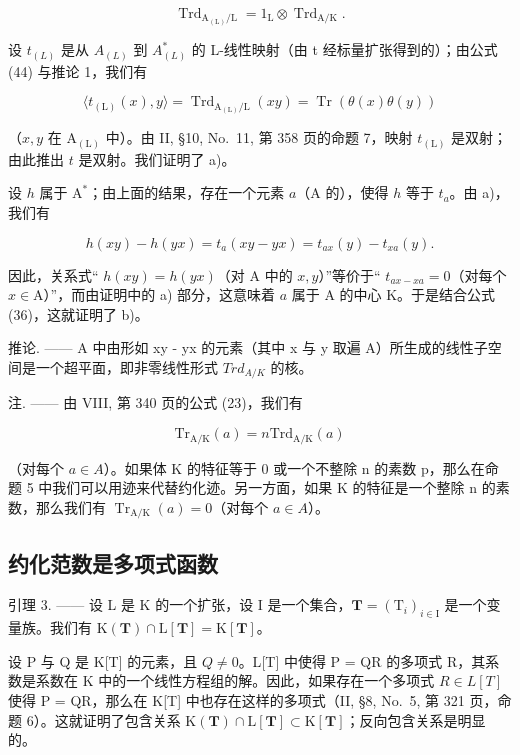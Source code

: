 \[
\operatorname{Trd} _ {\mathrm{A} _ {(\mathrm{L})} / \mathrm{L}} = 1 _ {\mathrm{L}} \otimes \operatorname{Trd} _ {\mathrm{A} / \mathrm{K}}.\tag{44}
\]

设 \(t_{(L)}\) 是从 \(A_{(L)}\) 到 \(A_{(L)}^{*}\) 的 L-线性映射（由 t 经标量扩张得到的）；由公式 (44) 与推论 1，我们有

\[
\langle t _ {(\mathrm{L})} (x), y \rangle = \operatorname{Trd} _ {\mathrm{A} _ {(\mathrm{L})} / \mathrm{L}} (x y) = \operatorname{Tr} (\theta (x) \theta (y))\tag{45}
\]

（\(x, y\) 在 \(\mathrm{A}_{(\mathrm{L})}\) 中）。由 II, §10, No.~11, 第 358 页的命题 7，映射 \(t_{(\mathrm{L})}\) 是双射；由此推出 \(t\) 是双射。我们证明了 a)。

设 \(h\) 属于 \(\mathrm{A}^*\)；由上面的结果，存在一个元素 \(a\)（\(\mathrm{A}\) 的），使得 \(h\) 等于 \(t_a\)。由 a)，我们有

\[
h (x y) - h (y x) = t _ {a} (x y - y x) = t _ {a x} (y) - t _ {x a} (y).
\]

因此，关系式`` \(h(xy) = h(yx)\)（对 A 中的 \(x,y\)）''等价于`` \(t_{ax-xa} = 0\)（对每个 \(x \in \mathrm{A}\)）''，而由证明中的 a) 部分，这意味着 \(a\) 属于 A 的中心 K。于是结合公式 (36)，这就证明了 b)。

推论. —— A 中由形如 xy - yx 的元素（其中 x 与 y 取遍 A）所生成的线性子空间是一个超平面，即非零线性形式 \(Trd_{A/K}\) 的核。

注. —— 由 VIII, 第 340 页的公式 (23)，我们有

\[
\mathrm{Tr} _ {\mathrm{A/K}} (a) = n \mathrm{Trd} _ {\mathrm{A/K}} (a)
\]

（对每个 \(a \in A\)）。如果体 K 的特征等于 0 或一个不整除 n 的素数 p，那么在命题 5 中我们可以用迹来代替约化迹。另一方面，如果 K 的特征是一个整除 n 的素数，那么我们有 \(\operatorname{Tr}_{\mathrm{A}/\mathrm{K}}(a) = 0\)（对每个 \(a \in A\)）。

\subsection{约化范数是多项式函数}

引理 3. —— 设 L 是 K 的一个扩张，设 I 是一个集合，\(\mathbf{T} = (\mathrm{T}_i)_{i\in \mathrm{I}}\) 是一个变量族。我们有 \(\mathrm{K}(\mathbf{T})\cap \mathrm{L}[\mathbf{T}] = \mathrm{K}[\mathbf{T}]\)。

设 P 与 Q 是 K{[}T{]} 的元素，且 \(Q \neq 0\)。L{[}T{]} 中使得 P = QR 的多项式 R，其系数是系数在 K 中的一个线性方程组的解。因此，如果存在一个多项式 \(R \in L[T]\) 使得 P = QR，那么在 K{[}T{]} 中也存在这样的多项式（II, §8, No.~5, 第 321 页，命题 6）。这就证明了包含关系 \(\mathrm{K}(\mathbf{T}) \cap \mathrm{L}[\mathbf{T}] \subset \mathrm{K}[\mathbf{T}]\)；反向包含关系是明显的。

